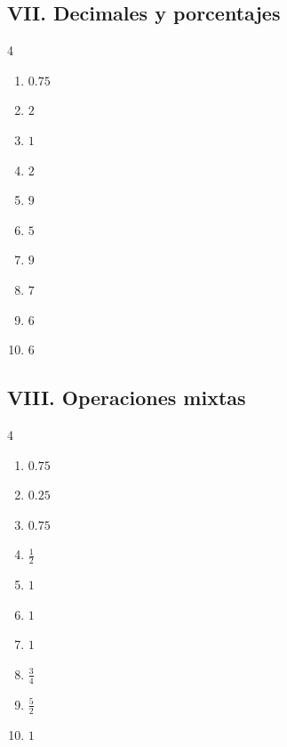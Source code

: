 \documentclass[11pt]{article}
\begin{document}
\subsection*{VII. Decimales y porcentajes}
\begin{multicols}{4}\begin{enumerate}[leftmargin=*,start=81]
\item $\displaystyle 0.75$
\item $\displaystyle 2$
\item $\displaystyle 1$
\item $\displaystyle 2$
\item $\displaystyle 9$
\item $\displaystyle 5$
\item $\displaystyle 9$
\item $\displaystyle 7$
\item $\displaystyle 6$
\item $\displaystyle 6$
\end{enumerate}\end{multicols}
\subsection*{VIII. Operaciones mixtas}
\begin{multicols}{4}\begin{enumerate}[leftmargin=*,start=91]
\item $\displaystyle 0.75$
\item $\displaystyle 0.25$
\item $\displaystyle 0.75$
\item $\displaystyle \frac12$
\item $\displaystyle 1$
\item $\displaystyle 1$
\item $\displaystyle 1$
\item $\displaystyle \frac34$
\item $\displaystyle \frac52$
\item $\displaystyle 1$
\end{enumerate}\end{multicols}
\end{document}
